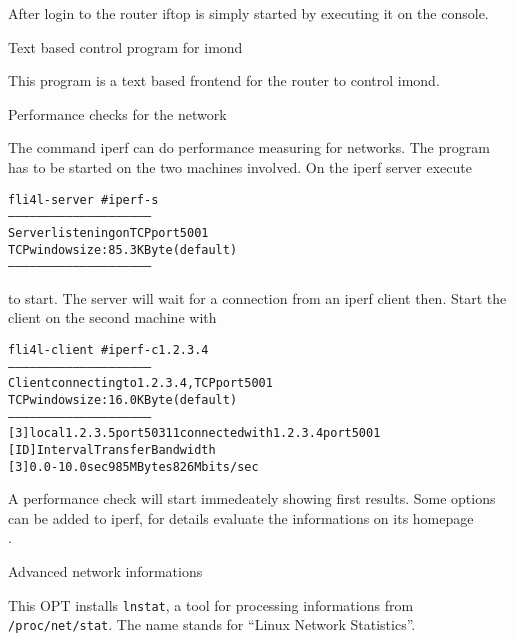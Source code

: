\begin{description}
    After login to the router iftop is simply started by executing it on the
    console.

 Text based control program for imond

    This program is a text based frontend for the router to control imond.

 Performance checks for the network

    The command iperf can do performance measuring for networks. The program
    has to be started on the two machines involved. On the iperf server execute

\begin{example}
\begin{alltt}
fli4l-server \version~\# iperf -s
------------------------------------------------------------
Server listening on TCP port 5001
TCP window size: 85.3 KByte (default)
------------------------------------------------------------
\end{alltt}
\end{example}

    to start. The server will wait for a connection from an iperf client then. Start
    the client on the second machine with

\begin{example}
\begin{alltt}
fli4l-client \version~\# iperf -c 1.2.3.4
------------------------------------------------------------
Client connecting to 1.2.3.4, TCP port 5001
TCP window size: 16.0 KByte (default)
------------------------------------------------------------
[  3] local 1.2.3.5 port 50311 connected with 1.2.3.4 port 5001
[ ID] Interval       Transfer     Bandwidth
[  3]  0.0-10.0 sec    985 MBytes    826 Mbits/sec
\end{alltt}
\end{example}

    A performance check will start immedeately showing first results. Some options
    can be added to iperf, for details evaluate the informations on its homepage \\
    .

 Advanced network informations

    This OPT installs \texttt{lnstat}, a tool for processing
    informations from  \texttt{/proc/net/stat}. The name stands for ``Linux
    Network Statistics''.


\end{description}
